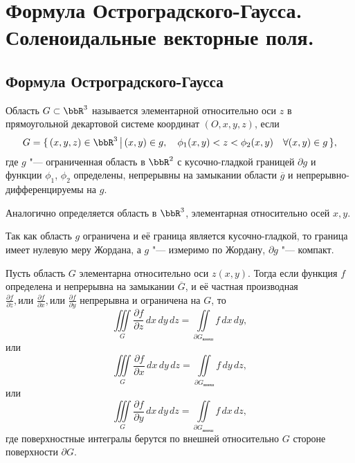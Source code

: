\chapter{Формула Остроградского-Гаусса. Соленоидальные векторные поля.}
\section{Формула Остроградского-Гаусса}

\begin{defn}
Область $G \subset \bbR^3$ называется элементарной относительно оси $z$ в прямоугольной декартовой системе координат $(O, x, y, z)$, если 
\begin{equation} \label{ch15eq1}
G = \{\, (x,y,z) \in \bbR^3\,\big|\, (x,y) \in g, \quad \phi_1(x,y) < z < \phi_2(x,y) \quad \forall (x,y) \in g\,\}, 
\end{equation}
где $g$ "--- ограниченная область в $\bbR^2$ с кусочно-гладкой границей $\partial g$ и функции $\phi_1$, $\phi_2$ определены, непрерывны на замыкании области $\overline{g}$ и непрерывно-дифференцируемы на $g$.
\end{defn}

Аналогично определяется область в $\bbR^3$, элементарная относительно осей $x,y$.

\begin{notion}
Так как область $g$ ограничена и её граница является кусочно-гладкой, то граница имеет нулевую меру Жордана, а $g$ "--- измеримо по Жордану, $\partial g$ "--- компакт.
\end{notion}

\begin{lemm} \label{ch15lemm1}
Пусть область $G$ элементарна относительно оси $z(x,y)$. Тогда если функция $f$ определена и непрерывна на замыкании $\overline{G}$, и её частная производная $\frac{\partial f}{\partial z}, \textit{или }\frac{\partial f}{\partial x}, \textit{или }\frac{\partial f}{\partial y}$ непрерывна и ограничена на $G$, то 
\begin{equation} \label{ch15eq2z}
\iiint\limits_{G} \frac{\partial f}{\partial z}\,dx\,dy\,dz = \iint\limits_{\partial	G_{\textit{внеш}}} f \,dx\,dy,
\end{equation}
или
\begin{equation} \label{ch15eq2x}
\iiint\limits_{G} \frac{\partial f}{\partial x}\,dx\,dy\,dz = \iint\limits_{\partial	G_{\textit{внеш}}} f \,dy\,dz,
\end{equation}
или
\begin{equation} \label{ch15eq2y}
\iiint\limits_{G} \frac{\partial f}{\partial y}\,dx\,dy\,dz = \iint\limits_{\partial	G_{\textit{внеш}}} f \,dx\,dz,
\end{equation}
где поверхностные интегралы берутся по внешней относительно $G$ стороне поверхности $\partial G$.
\end{lemm}

